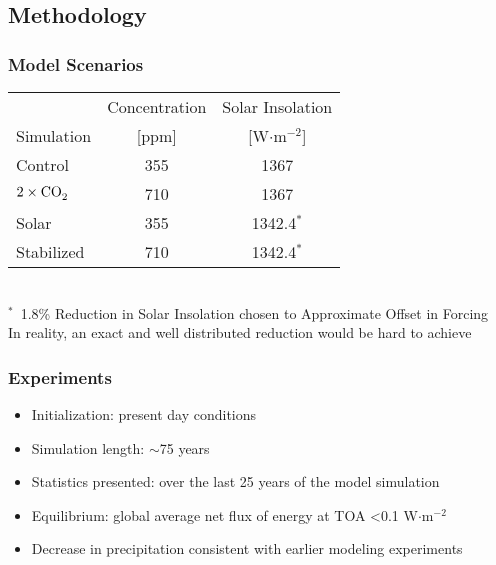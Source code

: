 \documentclass{beamer}
\begin{document}
\subsection{Methodology}
\begin{frame}
\frametitle{Model Scenarios}
\begin{center}
	\begin{tabular}{| l | c | c |}
		\hline
		  & \ce{CO2} Concentration & Solar Insolation\\
		Simulation & [ppm] & [W$\cdot$m$^{-2}$] \\ \hline\hline
		Control & 355 & 1367 \\ 
		$2\times\ce{CO2}$ & 710 & 1367 \\ 
		Solar & 355 & 1342.4$^*$ \\ 
		Stabilized & 710 & 1342.4$^*$ \\ \hline
	\end{tabular}
\\\vspace{0.5cm}
$^*$~1.8\% Reduction in Solar Insolation chosen to Approximate  Offset in Forcing\\\vspace{0.3cm}
In reality, an exact and well distributed reduction would be hard to achieve
\end{center}
\end{frame}

\begin{frame}
\frametitle{Experiments}
\begin{itemize}
	\item Initialization: present day conditions
	\vspace{0.5cm}
	\item Simulation length: $\sim$75 years
	\vspace{0.5cm}
	\item Statistics presented: over the last 25 years of the model simulation
	\vspace{0.5cm}
	\item Equilibrium: global average net flux of energy at TOA \textless 0.1 W$\cdot$m$^{-2}$
	\vspace{0.5cm}
	\item Decrease in precipitation consistent with earlier modeling experiments
\end{itemize}
\end{frame}
\end{document}
